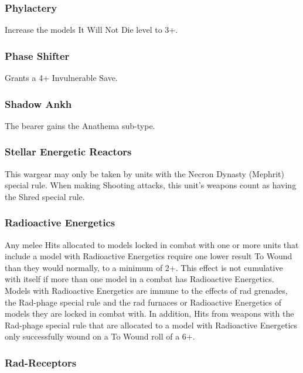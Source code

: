 \subsubsection{Phylactery} \label{Phylactery}

Increase the models It Will Not Die level to 3+.

\subsubsection{Phase Shifter} \label{Phase Shifter}

Grants a 4+ Invulnerable Save.

\subsubsection{Shadow Ankh} \label{Shadow Ankh}

The bearer gains the Anathema sub-type.

\subsubsection{Stellar Energetic Reactors} \label{Stellar Energetic Reactors}

This wargear may only be taken by units with the Necron Dynasty (Mephrit) special rule. When making Shooting attacks, this unit's weapons count as having the Shred special rule.

\subsubsection{Radioactive Energetics} \label{Radioactive Energetics}

Any melee Hits allocated to models locked in combat with one or more units that include a model with Radioactive Energetics require one lower result To Wound than they would normally, to a minimum of 2+. This effect is not cumulative with itself if more than one model in a combat has Radioactive Energetics. Models with Radioactive Energetics are immune to the effects of rad grenades, the Rad-phage special rule and the rad furnaces or Radioactive Energetics of models they are locked in combat with. In addition, Hits from weapons with the Rad-phage special rule that are allocated to a model with Radioactive Energetics only successfully wound on a To Wound roll of a 6+. 

\subsubsection{Rad-Receptors} \label{Rad Receptors}

